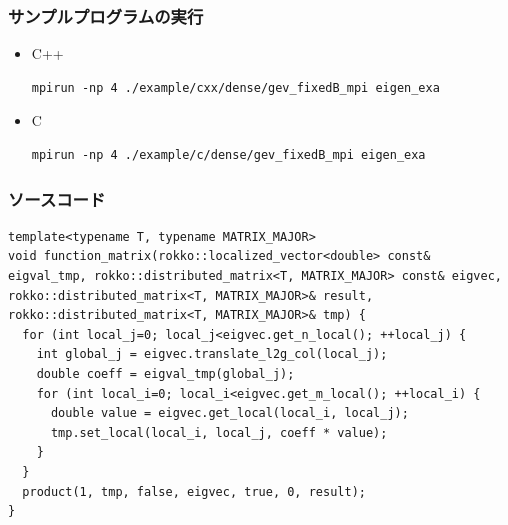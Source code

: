 \begin{frame}[c,fragile]
  \frametitle{サンプルプログラムの実行}
  \begin{itemize}
  \item C++
\begin{lstlisting}[style=shstyle]
mpirun -np 4 ./example/cxx/dense/gev_fixedB_mpi eigen_exa
\end{lstlisting}
  \item C
\begin{lstlisting}[style=shstyle]
mpirun -np 4 ./example/c/dense/gev_fixedB_mpi eigen_exa
\end{lstlisting}
\end{itemize}

\end{frame}

\begin{frame}[c,fragile]
  \frametitle{ソースコード}
\begin{lstlisting}
template<typename T, typename MATRIX_MAJOR>
void function_matrix(rokko::localized_vector<double> const& eigval_tmp, rokko::distributed_matrix<T, MATRIX_MAJOR> const& eigvec, rokko::distributed_matrix<T, MATRIX_MAJOR>& result, rokko::distributed_matrix<T, MATRIX_MAJOR>& tmp) {
  for (int local_j=0; local_j<eigvec.get_n_local(); ++local_j) {
    int global_j = eigvec.translate_l2g_col(local_j);
    double coeff = eigval_tmp(global_j);
    for (int local_i=0; local_i<eigvec.get_m_local(); ++local_i) {
      double value = eigvec.get_local(local_i, local_j);
      tmp.set_local(local_i, local_j, coeff * value); 
    }
  }
  product(1, tmp, false, eigvec, true, 0, result);
}
\end{lstlisting}
\end{frame}



